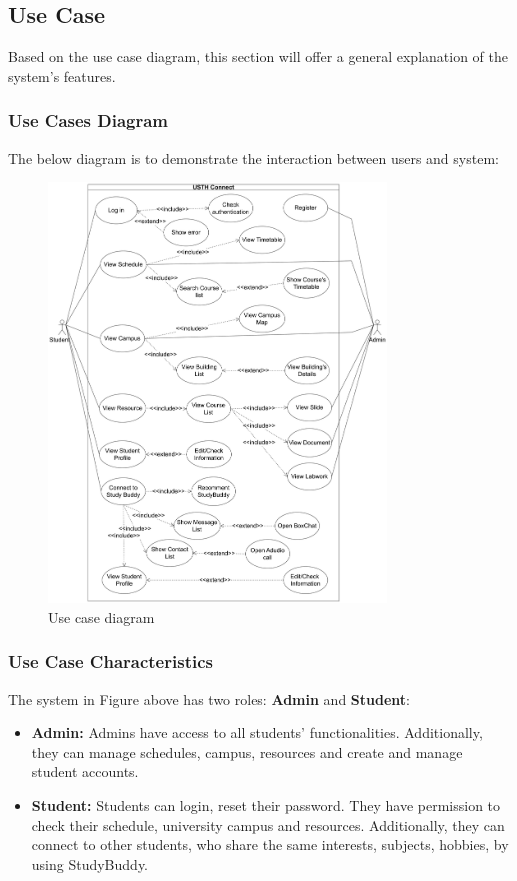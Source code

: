 \documentclass[12pt]{article}
\begin{document}
\pagebreak

\subsection{Use Case}
Based on the use case diagram, this section will offer a general explanation of the system's
features.

\subsubsection{Use Cases Diagram}
    The below diagram is to demonstrate the interaction between users and system:
    \begin{figure}[H]
        \centering
       \includegraphics[width=0.8\textwidth]{image/USTHConnect_usecase_diagram.pdf} 
        \caption{Use case diagram}
        \label{fig:usthconnect_use_case}
    \end{figure}

    \pagebreak

\subsubsection{Use Case Characteristics}
    The system in Figure above has two roles: \textbf{Admin} and \textbf{Student}:
    \begin{itemize}
        \item \textbf{Admin:} Admins have access to all students' functionalities. 
        Additionally, they can manage schedules, campus, resources and create and manage student accounts.
        \item \textbf{Student:}  Students can login, reset their password. They have permission to check their schedule, university campus and resources. Additionally, they can connect to other students, who share the same interests, subjects, hobbies,  by using StudyBuddy.
    \end{itemize}
\end{document}
